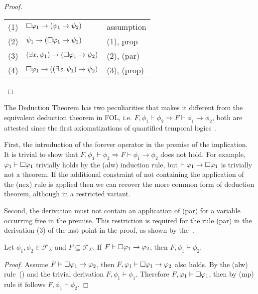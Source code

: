 \begin{proof}
\begin{enumerate}
      \begin{tabularx}{300pt}{cXl}
        (1) & $\Box{\varphi_1} \to (\psi_1 \to \psi_2)$ & assumption \\
        (2) & $\psi_1 \to (\Box{\varphi_1} \to \psi_2)$ & (1), prop \\
        (3) & $(\exists {x} \ldotp {\psi_1}) \to (\Box{\varphi_1} \to \psi_2)$ & (2), (par) \\
        (4) & $\Box{\varphi_1} \to ((\exists {x} \ldotp {\psi_1}) \to \psi_2)$ & (3), (prop) \\
      \end{tabularx}
  \end{enumerate}
\end{proof}

The Deduction Theorem has two peculiarities that makes it different from the equivalent deduction theorem in \ac{FOL},
i.e. $F, \phi_1 \vdash \phi_2 \Rightarrow F \vdash \phi_1 \to \phi_2$, both are attested since the first axiomatizations
of quantified temporal logics~\cite{kozen_verification_1982}.

First, the introduction of the forever operator in the premise of the implication. It is trivial to show that $F, \phi_1
\vdash \phi_2 \Rightarrow F \vdash \phi_1 \to \phi_2$ does not hold. For example, $\varphi_1 \vdash \Box{\varphi_1}$
trivially holds by the (alw) induction rule, but $\vdash \varphi_1 \to \Box{\varphi_1}$ is trivially not a theorem. If the
additional constraint of not containing the application of the (nex) rule is applied then we can recover the more common
form of deduction theorem, although in a restricted variant.

Second, the derivation must not contain an application of (par) for a variable occurring free in the premise.  This
restriction is required for the rule (par) in the derivation (3) of the last point in the proof, as shown by
the~.

\begin{theorem}
  Let $\phi_1, \phi_2 \in \mathcal{F}_\Sigma$ and $F \subseteq \mathcal{F}_\Sigma$. If $F \vdash \Box{\varphi_1} \to
  \varphi_2$, then $F, \phi_1 \vdash \phi_2$.
\end{theorem}
\begin{proof}
  Assume $F \vdash \Box{\varphi_1} \to \varphi_2$, then $F,\varphi_1 \vdash \Box{\varphi_1} \to \varphi_2$ also
  holds. By the (alw) rule~() and the trivial derivation $F, \phi_1 \vdash \phi_1$. Therefore
  $F, \varphi_1 \vdash \Box{\varphi_1}$, then by (mp) rule it follows $F, \phi_1 \vdash \phi_2$.
\end{proof}

